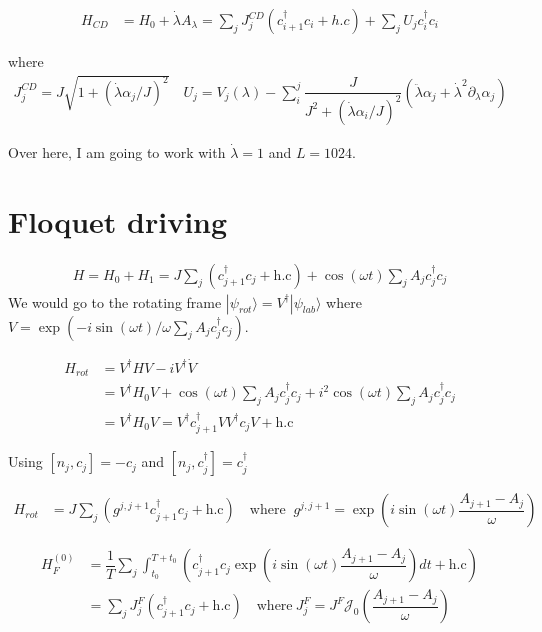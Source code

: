 \documentclass[11pt,a4paper]{article}
\begin{document}
\begin{align*}
H_{CD}&= H_0 + \dot{\lambda} A_{\lambda}=  \sum_j J^{CD}_j (c^{\dagger}_{i+1} c_i+ h.c) + \sum_j U_j  c^{\dagger}_{i} c_i
\end{align*}

where 
\begin{align*}
J^{CD}_j= J \sqrt{1 + (\dot{\lambda} \alpha_j/J)^2} \quad U_j = V_j( \lambda) - \sum_i^j \dfrac{J}{J^2 + (\dot{\lambda} \alpha_i/J)^2} (\ddot{\lambda} \alpha_j + \dot{\lambda}^2 \partial_{\lambda} \alpha_j)
\end{align*}

Over here, I am going to work with $\dot{\lambda}=1$ and $L=1024$.
\section{Floquet driving}

\begin{align*}
H = H_0 + H_1 = J\sum_j (c_{j+1}^{\dagger} c_j  + \mbox{h.c}) + \cos(\omega t) \sum_j A_j  c_j^{\dagger} c_j
\end{align*}
We would go to the rotating frame $|\psi_{rot} \rangle= V^{\dagger}|\psi_{lab} \rangle$
where $V=\exp(-i \sin(\omega t)/ \omega \sum_j A_j  c_j^{\dagger} c_j)$.

\begin{align*}
H_{rot}&= V^{\dagger} H V- i V^{\dagger} \dot{V}\\
&=V^{\dagger} H_0 V + \cos(\omega t) \sum_j A_j  c_j^{\dagger} c_j + i^2 \cos(\omega t) \sum_j A_j  c_j^{\dagger} c_j \\
&=V^{\dagger} H_0 V =V^{\dagger} c_{j+1}^{\dagger}V V^{\dagger} c_j V  + \mbox{h.c}
\end{align*}

Using $[n_j,c_j ]= -c_j$ and $[n_j,c_j^{\dagger} ]= c_j^{\dagger}$

\begin{align*}
H_{rot}&= J\sum_j   ( g^{j, j+1} c_{j+1}^{\dagger} c_j + \mbox{h.c}) \quad \mbox{where } ~ g^{j, j+1}= \exp\left(i \sin(\omega t) \dfrac{A_{j+1}- A_j}{\omega}\right)
\end{align*}




\begin{align*}
H_F^{(0)}&= \dfrac{1}{T}   \sum_j \int_{t_0}^{T+t_0}(c_{j+1}^{\dagger} c_j \exp\left(i \sin(\omega t) \dfrac{A_{j+1}- A_j}{\omega}\right) dt + \mbox{h.c})\\
&= \sum_j J_{j}^F (c_{j+1}^{\dagger} c_j + \mbox{h.c}) \quad \mbox{where} ~ J_{j}^F=J^F \mathcal{J}_0 \left(\dfrac{A_{j+1}- A_j}{\omega}\right)
\end{align*}
\end{document}
